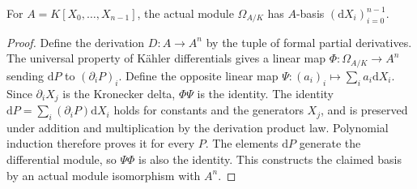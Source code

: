 \begin{theorem}
\label{sc0-canonical-port:geom:polynomial-differential-basis}
\mathlibok
For \(A=K[X_0,\ldots,X_{n-1}]\), the actual module
\(\Omega_{A/K}\) has \(A\)-basis
\((\mathrm dX_i)_{i=0}^{n-1}\).
\end{theorem}
\begin{proof}
Define the derivation \(D:A\to A^n\) by the tuple of formal
partial derivatives. The universal property of K\"ahler differentials
gives a linear map \(\Phi:\Omega_{A/K}\to A^n\) sending
\(\mathrm dP\) to \((\partial_iP)_i\). Define the opposite
linear map \(\Psi:(a_i)_i\mapsto\sum_i a_i\mathrm dX_i\).
Since \(\partial_iX_j\) is the Kronecker delta,
\(\Phi\Psi\) is the identity. The identity
\(\mathrm dP=\sum_i(\partial_iP)\mathrm dX_i\) holds for
constants and the generators \(X_j\), and is preserved under
addition and multiplication by the derivation product law.
Polynomial induction therefore proves it for every \(P\).
The elements \(\mathrm dP\) generate the differential module,
so \(\Psi\Phi\) is also the identity. This constructs the claimed
basis by an actual module isomorphism with \(A^n\).
\end{proof}
